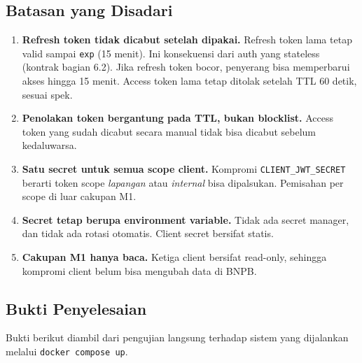 \subsection{Batasan yang Disadari}
\begin{enumerate}
  \item \textbf{Refresh token tidak dicabut setelah dipakai.} Refresh token lama
  tetap valid sampai \texttt{exp} (15 menit). Ini konsekuensi dari auth yang stateless
  (kontrak bagian 6.2). Jika refresh token bocor, penyerang bisa memperbarui akses hingga
  15 menit. Access token lama tetap ditolak setelah TTL 60 detik, sesuai spek.
  \item \textbf{Penolakan token bergantung pada TTL, bukan blocklist.} Access token
  yang sudah dicabut secara manual tidak bisa dicabut sebelum kedaluwarsa.
  \item \textbf{Satu secret untuk semua scope client.} Kompromi \texttt{CLIENT\_JWT\_SECRET}
  berarti token scope \textit{lapangan} atau \textit{internal} bisa dipalsukan. Pemisahan
  per scope di luar cakupan M1.
  \item \textbf{Secret tetap berupa environment variable.} Tidak ada secret manager, dan
  tidak ada rotasi otomatis. Client secret bersifat statis.
  \item \textbf{Cakupan M1 hanya baca.} Ketiga client bersifat read-only, sehingga
  kompromi client belum bisa mengubah data di BNPB.
\end{enumerate}

\subsection{Bukti Penyelesaian}
Bukti berikut diambil dari pengujian langsung terhadap sistem yang dijalankan
melalui \texttt{docker compose up}.

